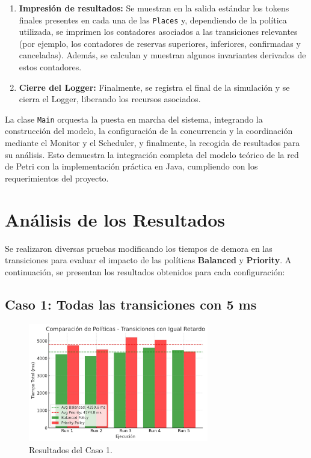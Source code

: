 \documentclass[12pt]{article}
\begin{document}
\begin{enumerate}
    \item \textbf{Impresión de resultados:}  
    Se muestran en la salida estándar los tokens finales presentes en cada una de las \texttt{Places} y, dependiendo de la política utilizada, se imprimen los contadores asociados a las transiciones relevantes (por ejemplo, los contadores de reservas superiores, inferiores, confirmadas y canceladas). Además, se calculan y muestran algunos invariantes derivados de estos contadores.

    \item \textbf{Cierre del Logger:}  
    Finalmente, se registra el final de la simulación y se cierra el Logger, liberando los recursos asociados.
\end{enumerate}

La clase \texttt{Main} orquesta la puesta en marcha del sistema, integrando la construcción del modelo, la configuración de la concurrencia y la coordinación mediante el Monitor y el Scheduler, y finalmente, la recogida de resultados para su análisis. Esto demuestra la integración completa del modelo teórico de la red de Petri con la implementación práctica en Java, cumpliendo con los requerimientos del proyecto.

\section{Análisis de los Resultados}

Se realizaron diversas pruebas modificando los tiempos de demora en las transiciones para evaluar el impacto de las políticas \textbf{Balanced} y \textbf{Priority}. A continuación, se presentan los resultados obtenidos para cada configuración:

\subsection{Caso 1: Todas las transiciones con 5 ms}

\begin{figure}[H]
    \centering
    \includegraphics[width=0.7\textwidth]{CASO_1.jpeg}
    \caption{Resultados del Caso 1.}
\end{figure}
\end{document}
